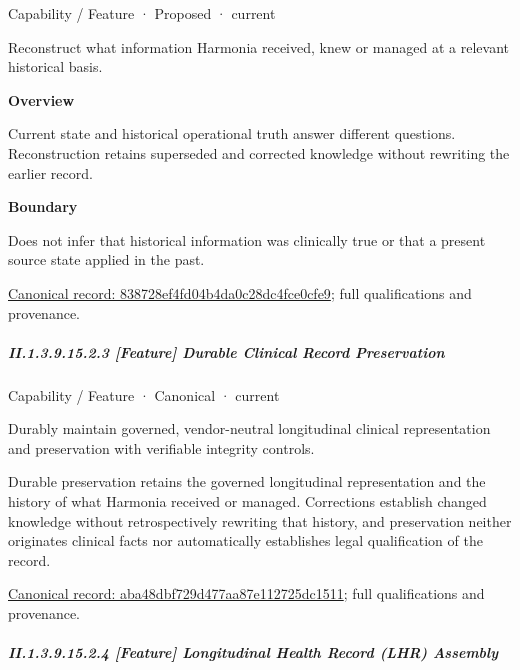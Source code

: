 \label{element:838728ef4fd04b4da0c28dc4fce0cfe9}
{\small Capability / Feature · Proposed · current}\par

Reconstruct what information Harmonia received, knew or managed at a relevant historical basis.



\textbf{Overview}



Current state and historical operational truth answer different questions. Reconstruction retains superseded and corrected knowledge without rewriting the earlier record.



\textbf{Boundary}



Does not infer that historical information was clinically true or that a present source state applied in the past.


{\footnotesize \href{../../../../continuum/strategy/capability/feature/838728ef4fd04b4da0c28dc4fce0cfe9.md}{Canonical record: 838728ef4fd04b4da0c28dc4fce0cfe9}; full qualifications and provenance.}\par
\subparagraph*{II.1.3.9.15.2.3 [Feature] Durable Clinical Record Preservation}
\label{navigation:II.1.3.9.15.2.3}

\label{element:aba48dbf729d477aa87e112725dc1511}
{\small Capability / Feature · Canonical · current}\par

Durably maintain governed, vendor-neutral longitudinal clinical representation and preservation with verifiable integrity controls.



Durable preservation retains the governed longitudinal representation and the history of what Harmonia received or managed. Corrections establish changed knowledge without retrospectively rewriting that history, and preservation neither originates clinical facts nor automatically establishes legal qualification of the record.


{\footnotesize \href{../../../../continuum/strategy/capability/feature/aba48dbf729d477aa87e112725dc1511.md}{Canonical record: aba48dbf729d477aa87e112725dc1511}; full qualifications and provenance.}\par
\subparagraph*{II.1.3.9.15.2.4 [Feature] Longitudinal Health Record (LHR) Assembly}
\label{navigation:II.1.3.9.15.2.4}

